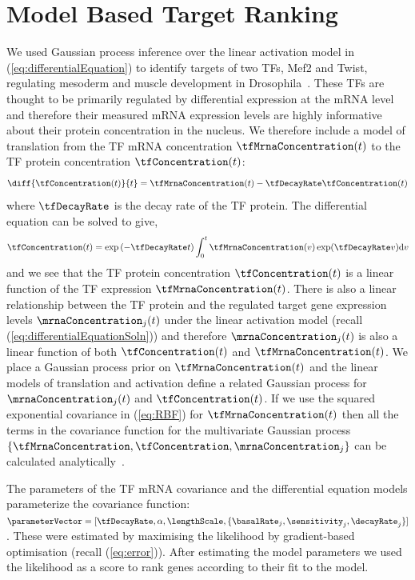 \documentclass{article}
\begin{document}
\section{Model Based Target Ranking}
\label{sec:targetRanking}

We used Gaussian process inference over the linear activation
model in (\ref{eq:differentialEquation}) to identify targets of two
TFs, Mef2 and Twist, regulating mesoderm and muscle development
in Drosophila~\citep{Honkela:modelbased10}. These TFs are thought to
be primarily regulated by differential
expression at the mRNA level and therefore their measured mRNA
expression levels are highly informative about their protein
concentration in the nucleus. We therefore include a model of
translation from the TF mRNA concentration $\tfMrnaConcentration(t)$ to the TF protein
concentration $\tfConcentration(t)$:
\begin{equation}
\diff{\tfConcentration(t)}{t} = \tfMrnaConcentration(t) - \tfDecayRate
\tfConcentration(t)
\end{equation}
where $\tfDecayRate$ is the decay rate of the TF protein. The
differential equation can be solved to give,
\[
\tfConcentration(t) = \exp\left(-\tfDecayRate t\right) \int_0^t
    \tfMrnaConcentration(v) \exp(\tfDecayRate v)  \mathrm{d}v
\]
and we see that the TF protein concentration  $\tfConcentration(t)$ is a linear function of the
TF expression $\tfMrnaConcentration(t)$. There is also a linear relationship
between the TF protein and the regulated target gene expression levels
$\mrnaConcentration_j(t)$ under the linear
activation model (recall
(\ref{eq:differentialEquationSoln})) and therefore $\mrnaConcentration_j(t)$
is also a linear function of both $\tfConcentration(t)$ and $\tfMrnaConcentration(t)$. We place a
Gaussian process prior on $\tfMrnaConcentration(t)$ and the linear models of
translation and activation define a related Gaussian process for
$\mrnaConcentration_j(t)$ and $\tfConcentration(t)$. If we use the squared
exponential covariance in (\ref{eq:RBF}) for $\tfMrnaConcentration(t)$
then all the terms in the covariance function for the multivariate Gaussian process 
$\{\tfMrnaConcentration,\tfConcentration,\mrnaConcentration_j\}$ can
be calculated analytically~\citep{Honkela:modelbased10}.  

The parameters of the TF mRNA
covariance and the differential equation models parameterize the covariance function: $\parameterVector =
[\tfDecayRate,\alpha,\lengthScale,\{\basalRate_j, \sensitivity_j,
  \decayRate_j\}]$. These were estimated by maximising the likelihood by
gradient-based optimisation (recall (\ref{eq:error})). After
estimating the model parameters we used the likelihood as a score to
rank genes according to their fit to the model. 
\end{document}
